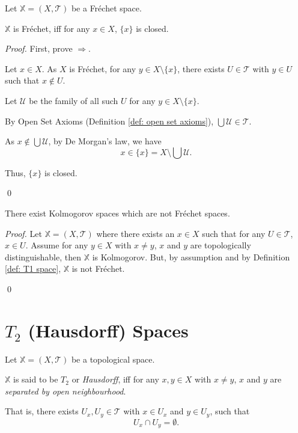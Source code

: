 \begin{proposition}
	\label{prop: T1 iff monotones are closed}
	Let $\mathbb X = (X, \mathcal T)$ be a Fr\'echet space.
	
	$\mathbb X$ is Fr\'echet, iff for any $x \in X$, $\{x\}$ is closed.
	
	\begin{proof}
		First, prove $\Rightarrow$.
		
		Let $x \in X$.
		As $X$ is Fr\'echet, for any $y \in X \setminus \{x\}$, there exists $U \in \mathcal T$ with $y \in U$ such that $x \notin U$.
		
		Let $\mathcal U$ be the family of all such $U$ for any $y \in X \setminus \{x\}$.
		
		By Open Set Axioms (Definition \ref{def: open set axioms}), $\bigcup \mathcal U \in \mathcal T$.
		
		As $x \notin \bigcup \mathcal U$, by De Morgan's law, we have
		$$
		x \in \{x\} = X \setminus \bigcup \mathcal U.
		$$
		
		Thus, $\{x\}$ is closed.
		
		\qed
	\end{proof}
\end{proposition}


\begin{proposition}
	There exist Kolmogorov spaces which are not Fr\'echet spaces.
	
	\begin{proof}
		Let $\mathbb X = (X, \mathcal T)$ where there exists an $x \in X$ such that for any $U \in \mathcal T$, $x \in U$. Assume for any $y \in X$ with $x \ne y$, $x$ and $y$ are topologically distinguishable, then $\mathbb X$ is Kolmogorov. But, by assumption and by Definition \ref{def: T1 space}, $\mathbb X$ is not Fr\'echet.
		
		\qed
	\end{proof}
\end{proposition}


\section{$T_2$ (Hausdorff) Spaces}


\begin{definition}
	\label{def: Hausdorff space}
	Let $\mathbb X = (X, \mathcal T)$ be a topological space.
	
	$\mathbb X$ is said to be $T_2$ or \textit{Hausdorff}, iff for any $x, y \in X$ with $x \ne y$, $x$ and $y$ are \textit{separated by open neighbourhood}.
	
	That is, there exists $U_x, U_y \in \mathcal T$ with $x \in U_x$ and $y \in U_y$, such that
	$$
	U_x \cap U_y = \emptyset.
	$$
\end{definition}


